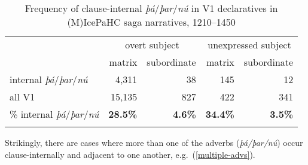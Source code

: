 \documentclass[output=paper,colorlinks,citecolor=brown]{langscibook}
\begin{document}
\begin{table}
\caption{Frequency of clause-internal \textit{þá}/\textit{þar}/\textit{nú} in V1 declaratives in (M)IcePaHC saga narratives, 1210--1450}
\label{tab:internal_v1}
 \begin{tabularx}{.9\textwidth}{X rrrr}
  \lsptoprule
  &   \multicolumn{2}{c}{overt subject} &   \multicolumn{2}{c}{unexpressed subject}\\
   \cmidrule(lr){2-3}   \cmidrule(lr){4-5}
            & matrix & subordinate  & matrix & subordinate\\
  \midrule
  internal \textit{þá}/\textit{þar}/\textit{nú}  &  4,311   &   38   &   145     &  12\\
  all V1                                         & 15,135  &  827   &   422   & 341 \\
 \% internal \textit{þá}/\textit{þar}/\textit{nú}  &  \textbf{28.5\%}  &  \textbf{4.6\%} & \textbf{34.4\%}  & \textbf{3.5\%}\\
  \lspbottomrule
 \end{tabularx}
\end{table}

Strikingly, there are cases where more than one of the adverbs (\textit{þá/þar/nú}) occur clause-internally and adjacent to one another, e.g.~(\ref{multiple-advs}).
\end{document}

